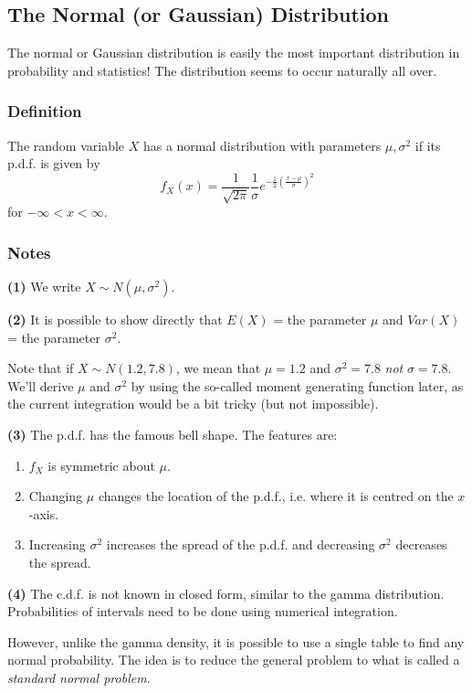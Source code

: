 \documentclass[12pt]{article}
\begin{document}
\subsection{The Normal (or Gaussian) Distribution}
The normal or Gaussian distribution is easily the most important distribution in probability and statistics! The distribution seems to occur naturally all over.

\subsubsection{Definition}
The random variable $X$ has a normal distribution with parameters $\mu, \sigma^2$ if its p.d.f. is given by
\[
    f_X (x) = \frac{1}{\sqrt{2\pi}} \frac{1}{\sigma} e^{- \frac{1}{2} (\frac{x - \mu}{\sigma})^2}
\]
for $-\infty < x < \infty$.

\subsubsection{Notes}
\textbf{(1)}
We write $X \sim N(\mu, \sigma^2)$.

\textbf{(2)}
It is possible to show directly that $E(X)$ = the parameter $\mu$ and $Var(X)$ = the parameter $\sigma^2$. 

Note that if $X \sim N(1.2, 7.8)$, we mean that $\mu = 1.2$ and $\sigma^2 = 7.8$ \emph{not} $\sigma = 7.8$. We'll derive $\mu$ and $\sigma^2$ by using the so-called moment generating function later, as the current integration would be a bit tricky (but not impossible).

\textbf{(3)}
The p.d.f. has the famous bell shape. The features are:
\begin{enumerate}
    \item $f_X$ is symmetric about $\mu$.
    \item Changing $\mu$ changes the location of the p.d.f., i.e. where it is centred on the $x$-axis.
    \item Increasing $\sigma^2$ increases the spread of the p.d.f. and decreasing $\sigma^2$ decreases the spread.
\end{enumerate}

\textbf{(4)}
The c.d.f. is not known in closed form, similar to the gamma distribution. Probabilities of intervals need to be done using numerical integration. 

However, unlike the gamma density, it is possible to use a single table to find any normal probability. The idea is to reduce the general problem to what is called a \emph{standard normal problem}.
\end{document}
